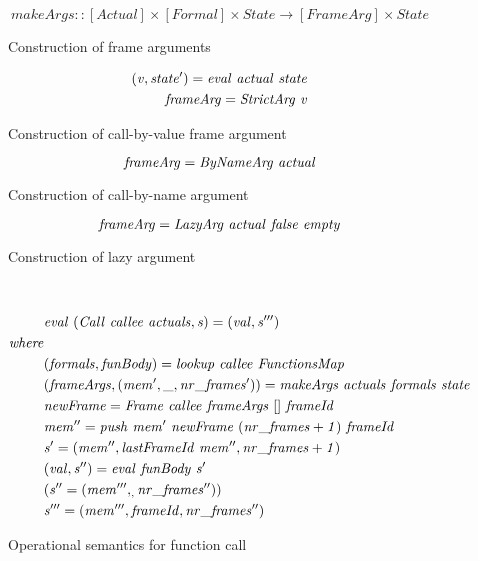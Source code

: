 \documentclass[diploma]{softlab-thesis}
\begin{document}
\begin{figure}[htp]
  \[ \mathit{makeArgs :: [Actual] \times [Formal] \times State \rightarrow [FrameArg] \times State} \]
\caption{Construction of frame arguments\label{fig:makeArgs}}
\end{figure}
\begin{figure}[htp]
  \begin{align*}
    \mathit{(v, state') = eval \hfill\ actual \hfill\ state} \\
    \mathit{frameArg = StrictArg \hfill\ v}
  \end{align*}
\caption{Construction of call-by-value frame argument\label{fig:makeCBVArg}}
\end{figure}
\begin{figure}[htp]
  \[ 
    \mathit{frameArg = ByNameArg \hfill\ actual} 
  \] 
\caption{Construction of call-by-name argument\label{fig:makeCBNArg}}
\end{figure}
\begin{figure}[htp]
  \[
    \mathit{frameArg = LazyArg \hfill\ actual \hfill\ false \hfill\ empty} 
  \]
\caption{Construction of lazy argument\label{lazyArgConstruction}}
\end{figure} ~
\begin{figure}[htp]
  \begin{align*}
    & \mathit{eval \hfill\ (Call \hfill\ callee \hfill\ actuals, s) = (val, s''')} \\
    \mathit{where} & \\
    & \mathit{(formals, funBody) = lookup \hfill\ callee \hfill\ FunctionsMap} \\
    & \mathit{(frameArgs, (mem', \_, nr\_frames')) = makeArgs \hfill\ actuals \hfill\ formals  \hfill\ state} \\
    & \mathit{newFrame = Frame \hfill\ callee \hfill\ frameArgs \hfill\ [] \hfill\ frameId} \\
    & \mathit{mem'' = push \hfill\ mem' \hfill\ newFrame \hfill\ (nr\_frames + 1) \hfill\ frameId} \\
    & \mathit{s' = (mem'', lastFrameId \hfill\ mem'', nr\_frames + 1)} \\
    & \mathit{(val, s'') = eval \hfill\ funBody \hfill\ s'} \\
    & \mathit{(s'' = (mem''', _, nr\_frames''))} \\
    & \mathit{s''' = (mem''', frameId, nr\_frames'')}
  \end{align*}
\caption{Operational semantics for function call\label{fig:functionCall}}
\end{figure}
\end{document}

